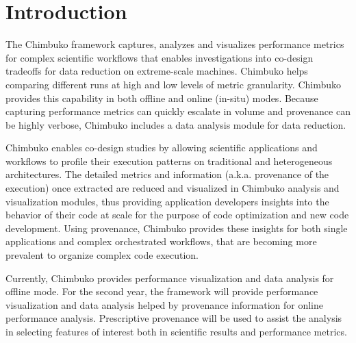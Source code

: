 \section{Introduction}
The Chimbuko framework captures, analyzes and visualizes performance metrics for complex scientific workflows that enables investigations into co-design tradeoffs for data reduction on extreme-scale machines.
Chimbuko helps comparing different runs at high and low levels of metric granularity. Chimbuko provides this capability in both offline and online (in-situ) modes. Because capturing performance metrics can quickly escalate in volume and provenance can be highly verbose, Chimbuko includes a data analysis module for data reduction. 

Chimbuko enables co-design studies by allowing scientific applications and workflows to profile their execution patterns on traditional and heterogeneous architectures.  The detailed metrics and information (a.k.a. provenance of the execution) once extracted are reduced and visualized in Chimbuko analysis and visualization modules, thus providing application developers insights into the behavior of their code at scale for the purpose of code optimization and new code development.  Using provenance, Chimbuko provides these insights for both single applications and complex orchestrated workflows, that are becoming more prevalent to organize complex code execution.

Currently, Chimbuko provides performance visualization and data analysis for offline mode.  For the second year, the framework will provide performance visualization and data analysis helped by provenance information for  online performance analysis. Prescriptive provenance will be used to assist the analysis in selecting features of interest both in scientific results and performance metrics.
	
